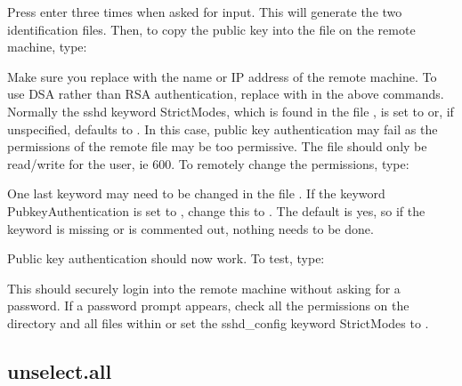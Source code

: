 

Press enter three times when asked for input.  This will generate the two identification
files.  Then, to copy  the public key into the 
 file on the remote machine,
type:



Make sure you replace 
 with the name or IP address of the remote machine.  To use
DSA rather than RSA authentication, replace 
 with 
 in the above commands.
Normally the sshd keyword StrictModes, which is found in the file 
, is
set to 
 or, if unspecified, defaults to 
.  In this case, public key authentication
may fail as the permissions of the remote file 
 may be too
permissive.  The file should only be read/write  for the user, ie 600.  To remotely change
the permissions, type:



One last keyword may need to be changed in the file 
.  If the keyword
PubkeyAuthentication is set to 
, change this to 
.  The default is yes, so if the
keyword is missing or is commented out, nothing needs to be done.

Public key authentication should now work.  To test, type:



This should securely login into the remote machine without asking for a password.  If a
password prompt appears, check all the permissions on the directory 
 and all files
within or set the sshd\_config keyword StrictModes to 
.






\newpage

\subsection{unselect.all}


